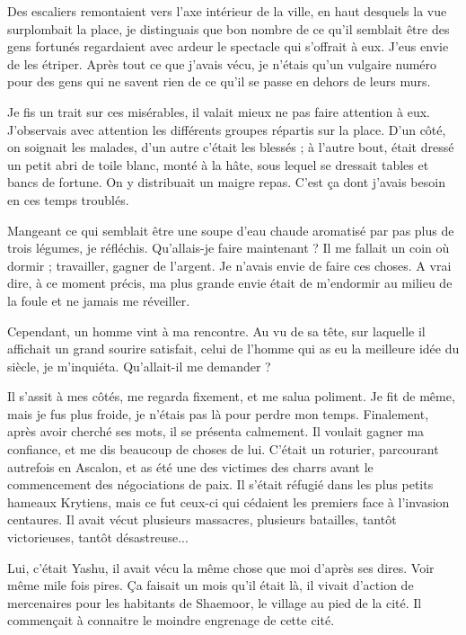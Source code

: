 \documentclass{book}
\begin{document}
Des escaliers remontaient vers l'axe intérieur de la ville, en haut desquels la vue surplombait la place, je distinguais que bon nombre de ce qu'il semblait être des gens fortunés regardaient avec ardeur le spectacle qui s'offrait à eux. J'eus envie de les étriper. Après tout ce que j'avais vécu, je n'étais qu'un vulgaire numéro pour des gens qui ne savent rien de ce qu'il se passe en dehors de leurs murs.\newline

Je fis un trait sur ces misérables, il valait mieux ne pas faire attention à eux. J'observais avec attention les différents groupes répartis sur la place. D'un côté, on soignait les malades, d'un autre c'était les blessés ; à l'autre bout, était dressé un petit abri de toile blanc, monté à la hâte, sous lequel se dressait tables et bancs de fortune. On y distribuait un maigre repas. C'est ça dont j'avais besoin en ces temps troublés.\newline

Mangeant ce qui semblait être une soupe d'eau chaude aromatisé par pas plus de trois légumes, je réfléchis. Qu'allais-je faire maintenant ? Il me fallait un coin où dormir ; travailler, gagner de l'argent. Je n'avais envie de faire ces choses. A vrai dire, à ce moment précis, ma plus grande envie était de m'endormir au milieu de la foule et ne jamais me réveiller.\newline

Cependant, un homme vint à ma rencontre. Au vu de sa tête, sur laquelle il affichait un grand sourire satisfait, celui de l'homme qui as eu la meilleure idée du siècle, je m'inquiéta. Qu'allait-il me demander ?\newline

Il s'assit à mes côtés, me regarda fixement, et me salua poliment. Je fit de même, mais je fus plus froide, je n'étais pas là pour perdre mon temps. Finalement, après avoir cherché ses mots, il se présenta calmement. Il voulait gagner ma confiance, et me dis beaucoup de choses de lui. C'était un roturier, parcourant autrefois en Ascalon, et as été une des victimes des charrs avant le commencement des négociations de paix. Il s'était réfugié dans les plus petits hameaux Krytiens, mais ce fut ceux-ci qui cédaient les premiers face à l'invasion centaures. Il avait vécut plusieurs massacres, plusieurs batailles, tantôt victorieuses, tantôt désastreuse...\newline

Lui, c'était Yashu, il avait vécu la même chose que moi d'après ses dires. Voir même mile fois pires. Ça faisait un mois qu'il était là, il vivait d'action de mercenaires pour les habitants de Shaemoor, le village au pied de la cité. Il commençait à connaitre le moindre engrenage de cette cité.\newline
\end{document}
